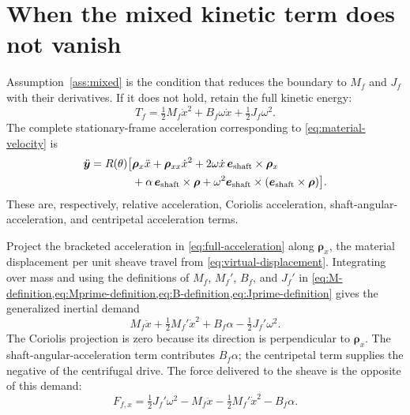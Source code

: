 \documentclass[11pt,letterpaper]{article}
\numberwithin{equation}{section}
\newcommand{\e}{\bm e_{\mathrm{shaft}}}
\newcommand{\rhoo}{\bm\rho}
\newcommand{\half}{\tfrac12}
\begin{document}
\clearpage
\appendix
\section{When the mixed kinetic term does not vanish}
\label{app:mixed}
\par

Assumption~\ref{ass:mixed} is the condition that reduces the boundary to $M_f$ and $J_f$ with their derivatives. If it does not hold, retain the full kinetic energy:
\begin{equation}
  T_f=\half M_f\dot x^2+B_f\omega\dot x+\half J_f\omega^2.
  \label{eq:mixed-energy}
\end{equation}
The complete stationary-frame acceleration corresponding to \cref{eq:material-velocity} is
\begin{align}
  \ddot{\bm y}=R(\theta)\big[&
      \rhoo_x\ddot x+\rhoo_{xx}\dot x^2
      +2\omega\dot x\,\e\times\rhoo_x\notag\\
      &+\alpha\,\e\times\rhoo
      +\omega^2\e\times(\e\times\rhoo)\big].
      \label{eq:full-acceleration}
\end{align}
These are, respectively, relative acceleration, Coriolis acceleration, shaft-angular-acceleration, and centripetal acceleration terms.

Project the bracketed acceleration in \cref{eq:full-acceleration} along $\rhoo_x$, the material displacement per unit sheave travel from \cref{eq:virtual-displacement}. Integrating over mass and using the definitions of $M_f$, $M_f'$, $B_f$, and $J_f'$ in \cref{eq:M-definition,eq:Mprime-definition,eq:B-definition,eq:Jprime-definition} gives the generalized inertial demand
\begin{equation}
  M_f\ddot x+\half M_f'\dot x^2+B_f\alpha-\half J_f'\omega^2.
\end{equation}
The Coriolis projection is zero because its direction is perpendicular to $\rhoo_x$. The shaft-angular-acceleration term contributes $B_f\alpha$; the centripetal term supplies the negative of the centrifugal drive. The force delivered to the sheave is the opposite of this demand:
\begin{equation}
  \boxed{F_{f,x}=\half J_f'\omega^2-M_f\ddot x
                  -\half M_f'\dot x^2-B_f\alpha.}
  \label{eq:mixed-force}
\end{equation}
\end{document}
